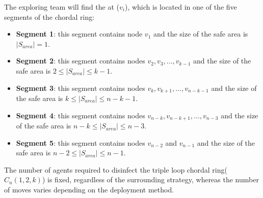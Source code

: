 The exploring team will find the \bv at ($v_i$), which is located in one of the five segments of the chordal ring:
\begin{itemize}

\item {\bf Segment 1}: this segment contains node $v_1$ and the size of the safe area is $|S_{area}| =1$.
\item {\bf Segment 2}: this segment contains nodes $v_2,v_3,...,v_{k-1}$ and the size of the safe area is $2\leq |S_{area}| \leq k-1$.
\item {\bf Segment 3}: this segment contains nodes $v_k,v_{k+1},...,v_{n-k-1}$ and the size of the safe area is $k\leq |S_{area}| \leq n-k-1$.
\item {\bf Segment 4}: this segment contains nodes $v_{n-k},v_{n-k+1},...,v_{n-3}$ and the size of the safe area is $n-k\leq |S_{area}| \leq n-3$.
\item {\bf Segment 5}: this segment contains nodes $v_{n-2}$ and $v_{n-1}$ and the size of the safe area is $n-2 \leq|S_{area}| \leq n-1$.
\end{itemize}





The number of agents required to disinfect the triple loop chordal ring($C_n(1,2,k)$) is fixed, regardless of the surrounding strategy, whereas the number of moves varies depending on the deployment method.


